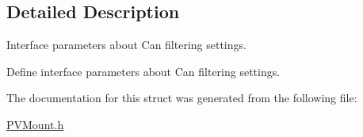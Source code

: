 \subsection{Detailed Description}
Interface parameters about Can filtering settings. 

Define interface parameters about Can filtering settings. 

The documentation for this struct was generated from the following file\+:\begin{DoxyCompactItemize}
\item 
\hyperlink{_p_v_mount_8h}{P\+V\+Mount.\+h}\end{DoxyCompactItemize}
